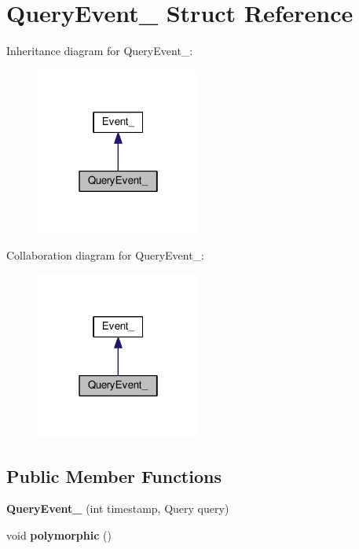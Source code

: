 \hypertarget{struct_query_event__}{}\section{Query\+Event\+\_\+ Struct Reference}
\label{struct_query_event__}


Inheritance diagram for Query\+Event\+\_\+\+:
\nopagebreak
\begin{figure}[H]
\begin{center}
\leavevmode
\includegraphics[width=154pt]{struct_query_event____inherit__graph}
\end{center}
\end{figure}


Collaboration diagram for Query\+Event\+\_\+\+:
\nopagebreak
\begin{figure}[H]
\begin{center}
\leavevmode
\includegraphics[width=154pt]{struct_query_event____coll__graph}
\end{center}
\end{figure}
\subsection*{Public Member Functions}
\begin{DoxyCompactItemize}
\item 
{\bfseries Query\+Event\+\_\+} (int timestamp, Query query)\hypertarget{struct_query_event___a13e81f98500d5daae31ccb5fb8242fcc}{}\label{struct_query_event___a13e81f98500d5daae31ccb5fb8242fcc}

\item 
void {\bfseries polymorphic} ()\hypertarget{struct_query_event___adf6a63b99179e31b39f74cd96ebac290}{}\label{struct_query_event___adf6a63b99179e31b39f74cd96ebac290}

\end{DoxyCompactItemize}
